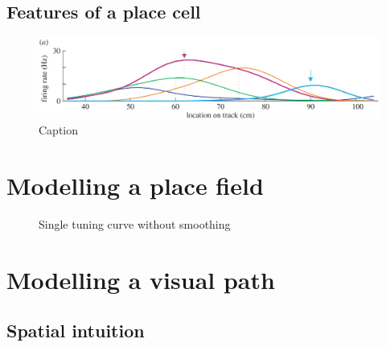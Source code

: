 \subsection{Features of a place cell}

\begin{figure}
\centering
\includegraphics[width=\textwidth]{./gfx/Chapter05/dragoi_et_al_place_cell.png}
\caption{Caption}
\label{}
\end{figure}

\section{Modelling a place field}

\begin{figure}
	\centering
	\setlength{}
	\setlength{}
		
	\caption{Single tuning curve without smoothing}
\end{figure}



\section{Modelling a visual path}



\subsection{Spatial intuition}

